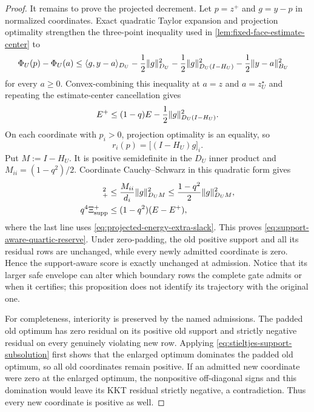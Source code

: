 \begin{proof}
It remains to prove the projected decrement.  Let $p=z^+$ and $g=y-p$ in
normalized coordinates.  Exact quadratic Taylor expansion and projection
optimality strengthen the three-point inequality used in
\cref{lem:fixed-face-estimate-center} to
\begin{align}
 \Phi_U(p)-\Phi_U(a)
 &\leq \langle g,y-a\rangle_{D_U}
 -\frac12\lVert g\rVert_{D_U}^2
 -\frac12\lVert g\rVert_{D_U(I-H_U)}^2
 -\frac12\lVert y-a\rVert_{B_U}^2
 \label{eq:projected-prox-exact-slack}
\end{align}
for every $a\geq0$.  Convex-combining this inequality at $a=z$ and
$a=z_U^\star$ and repeating the estimate-center cancellation gives
\begin{equation}
 E^+\leq(1-q)E-\frac12\lVert g\rVert_{D_U(I-H_U)}^2.
 \label{eq:projected-energy-extra-slack}
\end{equation}
On each coordinate with $p_i>0$, projection optimality is an equality, so
\begin{equation*}
 r_i(p)=\bigl[(I-H_U)g\bigr]_i.
\end{equation*}
Put $M:=I-H_U$.  It is positive semidefinite in the $D_U$ inner product and
$M_{ii}=(1-q^2)/2$.  Coordinate Cauchy--Schwarz in this quadratic form gives
\begin{align*}
 [(Mg)_i]_+^2
 &\leq\frac{M_{ii}}{d_i}\norm{g}_{D_UM}^2
 \leq\frac{1-q^2}{2}\norm{g}_{D_UM}^2,\\
 q^4\Xi_{\rm supp}^+
 &\leq(1-q^2)(E-E^+),
\end{align*}
where the last line uses \cref{eq:projected-energy-extra-slack}.
This proves \cref{eq:support-aware-quartic-reserve}.  Under zero-padding,
the old positive support and all its residual rows are unchanged, while every
newly admitted coordinate is zero.  Hence the support-aware score is exactly
unchanged at admission.  Notice that its larger safe envelope can alter which
boundary rows the complete gate admits or when it certifies; this proposition
does not identify its trajectory with the original one.

For completeness, interiority is preserved by the named admissions.  The
padded old optimum has zero residual on its positive old support and strictly
negative residual on every genuinely violating new row.  Applying
\cref{eq:stieltjes-support-subsolution} first shows that the enlarged optimum
dominates the padded old optimum, so all old coordinates remain positive.  If
an admitted new coordinate were zero at the enlarged optimum, the
nonpositive off-diagonal signs and this domination would leave its KKT
residual strictly negative, a contradiction.  Thus every new coordinate is
positive as well.


\end{proof}
